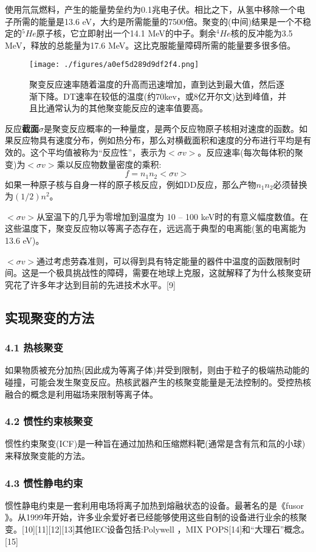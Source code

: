 使用氘氚燃料，产生的能量势垒约为0.1兆电子伏。相比之下，从氢中移除一个电子所需的能量是13.6 eV，大约是所需能量的7500倍。聚变的(中间)结果是一个不稳定的$^{5}He$原子核，它立即射出一个14.1 MeV的中子。剩余$^{4}He$核的反冲能为3.5 MeV，释放的总能量为17.6 MeV。这比克服能量障碍所需的能量要多很多倍。
\begin{figure}[ht]
\centering
\texttt{[image: ./figures/a0ef5d289d9df2f4.png]}
\caption{聚变反应速率随着温度的升高而迅速增加，直到达到最大值，然后逐渐下降。DT速率在较低的温度(约70kev，或8亿开尔文)达到峰值，并且比通常认为的其他聚变能反应的速率值要高。} \label{fig_HJB_5}
\end{figure}
反应\textbf{截面$\sigma$}是聚变反应概率的一种量度，是两个反应物原子核相对速度的函数。如果反应物具有速度分布，例如热分布，那么对横截面积和速度的分布进行平均是有效的。这个平均值被称为“反应性”，表示为$<\sigma v >$。反应速率(每次每体积的聚变)为$<\sigma v >$乘以反应物数量密度的乘积:
$$f=n_1n_2<\sigma v>~$$
如果一种原子核与自身一样的原子核反应，例如DD反应，那么产物$n_1n_2$必须替换为$(1/2)n^2$。

$<\sigma v >$从室温下的几乎为零增加到温度为 10 – 100 keV时的有意义幅度数值。在这些温度下，聚变反应物以等离子态存在，远远高于典型的电离能(氢的电离能为13.6 eV)。

$<\sigma v >$通过考虑劳森准则，可以得到具有特定能量的器件中温度的函数限制时间。这是一个极具挑战性的障碍，需要在地球上克服，这就解释了为什么核聚变研究花了许多年才达到目前的先进技术水平。[9]

\subsection{实现聚变的方法}
\subsubsection{4.1 热核聚变}
如果物质被充分加热(因此成为等离子体)并受到限制，则由于粒子的极端热动能的碰撞，可能会发生聚变反应。热核武器产生的核聚变能量是无法控制的。受控热核融合的概念是利用磁场来限制等离子体。
\subsubsection{4.2 惯性约束核聚变}
惯性约束聚变(ICF)是一种旨在通过加热和压缩燃料靶(通常是含有氘和氚的小球)来释放聚变能的方法。
\subsubsection{4.3 惯性静电约束}
惯性静电约束是一套利用电场将离子加热到熔融状态的设备。最著名的是《fusor 》。从1999年开始，许多业余爱好者已经能够使用这些自制的设备进行业余的核聚变。[10][11][12][13]其他IEC设备包括:Polywell ，MIX POPS[14]和“大理石”概念。[15]
